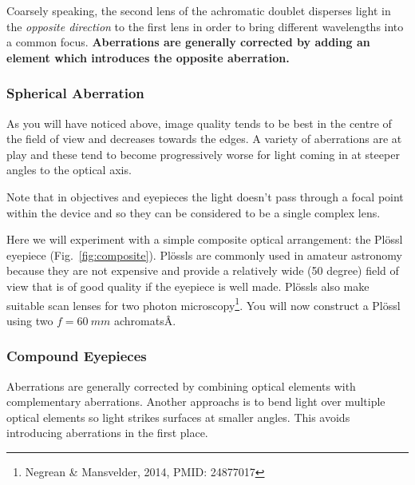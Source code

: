 \documentclass[a4paper]{report}
\begin{document}
Coarsely speaking, the second lens of the achromatic doublet disperses light in the \textit{opposite direction} to the first lens in order to bring different wavelengths into a common focus. 
\textbf{Aberrations are generally corrected by adding an element which introduces the opposite aberration.}






\subsubsection{Spherical Aberration}

As you will have noticed above, image quality tends to be best in the centre of the field of view and decreases towards the edges. 
A variety of aberrations are at play and these tend to become progressively worse for light coming in at steeper angles to the optical axis.


Note that in objectives and eyepieces the light doesn't pass through a focal point within the device and so they can be considered to be a single complex lens.


Here we will experiment with a simple composite optical arrangement: the Pl\"{o}ssl eyepiece (Fig.~\ref{fig:composite}). 
Pl\"{o}ssls are commonly used in amateur astronomy because they are not expensive and provide a relatively wide (50 degree) field of view that is of good 
quality if the eyepiece is well made. 
Pl\"{o}ssls also make suitable scan lenses for two photon microscopy\footnote{Negrean \& Mansvelder, 2014, PMID: 24877017}.
You will now construct a Pl\"{o}ssl using two $f=60~mm$  achromatsÂ.


\subsubsection{Compound Eyepieces}
Aberrations are generally corrected by combining optical elements with complementary aberrations. 
Another approachs is to bend light over multiple optical elements so light strikes surfaces at smaller angles. 
This avoids introducing aberrations in the first place. 
\end{document}

